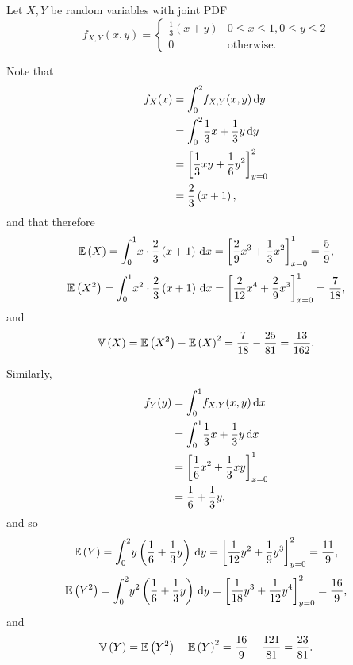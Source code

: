 \begin{ex}
  Let $X,Y$ be random variables with joint PDF
  \[
    f_{X, Y}(x,y)
    =\begin{cases}
      \frac{1}{3}\left(x+y\right) & 0\leq x\leq 1, 0\leq y\leq 2 \\
      0                           & \text{otherwise}.
    \end{cases}
  \]

  Note that
  \begin{align*}
    f_X(x)
     & =\int_0^2\! f_{X,Y}(x,y)\,\mathrm{d}{y}                      \\
     & =\int_0^2\! \frac{1}{3}x+\frac{1}{3}y\,\mathrm{d}{y}         \\
     & =\left[ \frac{1}{3}xy+\frac{1}{6}y^2 \right]_{y=0}^2 \\
     & =\frac{2}{3}\left(x+1\right),
  \end{align*}
  and that therefore
  \[
    \mathbb{E}\left(X\right)
    =\int_0^1\!x\cdot\frac{2}{3}\left(x+1\right)\,\mathrm{d}{x}
    =\left[ \frac{2}{9}x^3+\frac{1}{3}x^2 \right]_{x=0}^1
    =\frac{5}{9},
  \]
  \[
    \mathbb{E}\left(X^2\right)
    =\int_0^1\!x^2\cdot\frac{2}{3}\left(x+1\right)\,\mathrm{d}{x}
    =\left[ \frac{2}{12}x^4+\frac{2}{9}x^3 \right]_{x=0}^1
    =\frac{7}{18},
  \]
  and
  \begin{align*}
    \mathbb{V}\left(X\right)=\mathbb{E}\left(X^2\right)-\mathbb{E}\left(X\right)^2=\frac{7}{18}-\frac{25}{81}=\frac{13}{162}.
  \end{align*}

  Similarly,
  \begin{align*}
    f_Y(y)
     & =\int_0^1\! f_{X,Y}(x,y)\,\mathrm{d}{x}                    \\
     & =\int_0^1\! \frac{1}{3}x+\frac{1}{3}y\,\mathrm{d}{x}       \\
     & =\left[\frac{1}{6}x^2+\frac{1}{3}xy\right]_{x=0}^1 \\
     & =\frac{1}{6}+\frac{1}{3}y,
  \end{align*}
  and so
  \begin{align*}
    \mathbb{E}\left(Y\right)
    =\int_0^2\!y\left(\frac{1}{6}+\frac{1}{3}y\right)\,\mathrm{d}{y}
    =\left[ \frac{1}{12}y^2+\frac{1}{9}y^3 \right]_{y=0}^2
    =\frac{11}{9},
  \end{align*}
  \begin{align*}
    \mathbb{E}\left(Y^2\right)
    =\int_0^2\!y^2\left(\frac{1}{6}+\frac{1}{3}y\right)\,\mathrm{d}{y}
    =\left[ \frac{1}{18}y^3+\frac{1}{12}y^4 \right]_{y=0}^2
    =\frac{16}{9},
  \end{align*}
  and
  \begin{align*}
    \mathbb{V}\left(Y\right)=\mathbb{E}\left(Y^2\right)-\mathbb{E}\left(Y\right)^2=\frac{16}{9}-\frac{121}{81}=\frac{23}{81}.
  \end{align*}


\end{ex}
